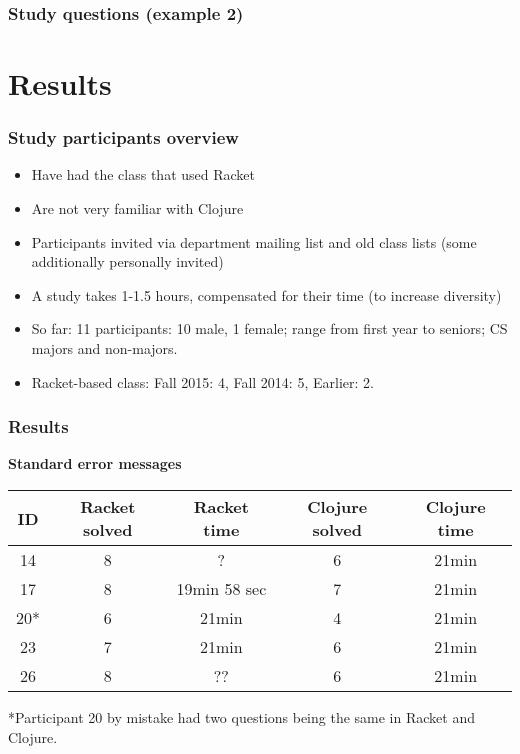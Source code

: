 \documentclass{beamer}
\newcommand{\comment}[1]{{\bf \tt  {#1}}}
\newcommand{\emcomment}[1]{\textcolor{ForestGreen}{\comment{Elena: {#1}}}}
\begin{document}
\begin{frame}
\frametitle{Study questions (example 2)}

\end{frame}

\section{Results}

\begin{frame}
\frametitle{Study participants overview}
\begin{itemize}
\item Have had the class that used Racket
\item Are not very familiar with Clojure 
\item Participants invited via department mailing list and old class lists (some additionally personally invited)
\item A study takes 1-1.5 hours, compensated for their time (to increase diversity)
\item So far: 11 participants: 10 male, 1 female; range from first year to seniors; CS majors and non-majors.  
\item Racket-based class: Fall 2015: 4, Fall 2014: 5, Earlier: 2. 
\end{itemize}
\end{frame}

\begin{frame}
\frametitle{Results}
{\bf Standard error messages} 
\vspace{0.1in}

\begin{tabular}{c | c| c| c | c }
\hline
{\bf ID} & {\bf Racket solved} & {\bf Racket time} & {\bf Clojure solved} & {\bf Clojure time} \\
\hline 
14 &  8 & ? &  6  &  21min \\
17 &  8 & 19min 58 sec &  7 &  21min \\
20* &  6 & 21min &  4 &  21min \\
23 &  7 & 21min &  6  &  21min \\
26 &  8 & ?? &  6 &  21min \\
\hline
\end{tabular}

*Participant 20 by mistake had two questions being the same in Racket and Clojure. 
\end{frame}
\end{document}
